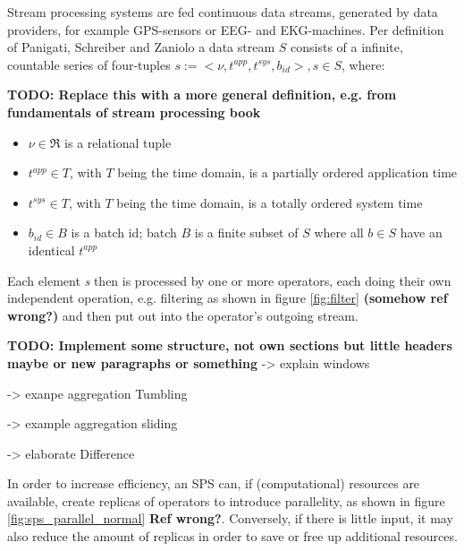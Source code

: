         Stream processing systems are fed continuous data streams, generated by data providers, for example GPS-sensors or EEG- and EKG-machines.
        Per definition of Panigati, Schreiber and Zaniolo\cite{Panigati2015} a data stream $S$ consists of a infinite, countable series of four-tuples $s := <\nu, t^{app }, t^{sys}, b_{id}>, s \in S$, where:

        \textbf{TODO: Replace this with a more general definition, e.g. from fundamentals of stream processing book}
        \begin{itemize}
        \item $\nu \in \mathfrak{R}$ is a relational tuple

        \item $t^{app} \in T$, with $T$ being the time domain, is a partially ordered application time
        
        \item $t^{sys} \in T$,  with $T$ being the time domain, is a totally ordered system time
        
        \item $b_{id} \in B$ is a batch id; batch $B$ is a finite subset of $S$ where all $b \in S$ have an identical $t^{app}$
        \end{itemize}

        Each element \textit{s} then is processed by one or more operators, each doing their own independent operation, e.g. filtering as shown in figure \ref{fig:filter} \textbf{(somehow ref wrong?)}
        and then put out into the operator's outgoing stream.

        \textbf{TODO: Implement some structure, not own sections but little headers maybe or new paragraphs or something}
        -> explain windows

        -> exanpe aggregation Tumbling

        -> example aggregation sliding

        -> elaborate Difference

        In order to increase efficiency, an SPS can, if (computational) resources are available, create replicas of operators to introduce parallelity, as shown in figure \ref{fig:sps_parallel_normal} \textbf{Ref wrong?}. 
        Conversely, if there is little input, it may also reduce the amount of replicas in order to save or free up additional resources.

